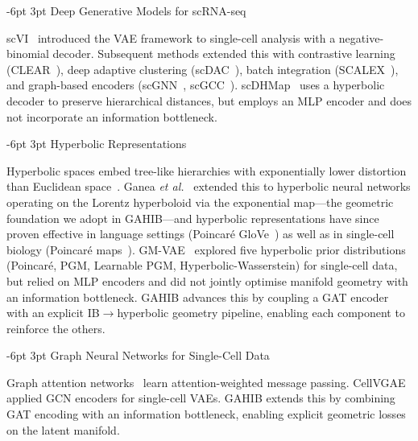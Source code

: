 \documentclass[preprint,12pt]{elsarticle}
\makeatletter
\renewcommand\subsection{\@startsection{subsection}{2}{\z@}%
  {-6pt \@plus -2pt \@minus -2pt}%
  {3pt \@plus 1pt \@minus 1pt}%
  {\normalfont\large\bfseries}}
\makeatother
\begin{document}
\subsection{Deep Generative Models for scRNA-seq}

scVI~\cite{lopez2018deep} introduced the VAE framework to single-cell
analysis with a negative-binomial decoder.
Subsequent methods extended this with contrastive learning
(CLEAR~\cite{han2022clear}), deep adaptive clustering
(scDAC~\cite{an2024scdac}), batch integration
(SCALEX~\cite{xiong2022scalex}), and graph-based encoders
(scGNN~\cite{wang2021scgnn}, scGCC~\cite{tian2023scgcc}).
scDHMap~\cite{tian2023scdhmap} uses a hyperbolic decoder to preserve
hierarchical distances, but employs an MLP encoder and does not incorporate
an information bottleneck.

\subsection{Hyperbolic Representations}

Hyperbolic spaces embed tree-like hierarchies with exponentially lower
distortion than Euclidean space~\cite{nickel2017poincare}.
Ganea \emph{et al.}~\cite{ganea2018hyperbolic} extended this to hyperbolic
neural networks operating on the Lorentz hyperboloid via the exponential
map---the geometric foundation we adopt in GAHIB---and hyperbolic
representations have since proven effective in language settings
(Poincar\'e GloVe~\cite{tifrea2019poincareglove}) as well as in
single-cell biology (Poincar\'e maps~\cite{klimovskaia2020poincare}).
GM-VAE~\cite{bayer2023gmvae} explored five hyperbolic prior distributions
(Poincar\'e, PGM, Learnable PGM, Hyperbolic-Wasserstein) for single-cell
data, but relied on MLP encoders and did not jointly optimise manifold
geometry with an information bottleneck.
GAHIB advances this by coupling a GAT encoder with an explicit
IB$\to$hyperbolic geometry pipeline, enabling each component to reinforce
the others.

\subsection{Graph Neural Networks for Single-Cell Data}

Graph attention networks~\cite{velickovic2018graph} learn
attention-weighted message passing.
CellVGAE~\cite{buterez2022cellvgae} applied GCN encoders for single-cell
VAEs.
GAHIB extends this by combining GAT encoding with an information bottleneck,
enabling explicit geometric losses on the latent manifold.
\end{document}
